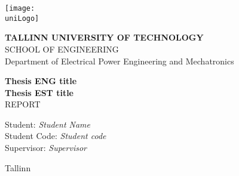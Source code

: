 \begin{titlepage}

    
    \newcommand{\thesisTitle}{
        Thesis ENG title
    }
    
    \newcommand{\thesisTitleEST}{Thesis EST title}
    
    \begin{flushleft}
        \texttt{[image: \\uniLogo]}
    
    
        \textcolor{TTUgray}{
            \textbf{TALLINN UNIVERSITY OF TECHNOLOGY} \\
            SCHOOL OF ENGINEERING \\
            Department of Electrical Power Engineering and Mechatronics}
    \end{flushleft}
    
    
        \begin{center}
            
    
            \vspace*{4cm}
            
            {
                { \textbf{\thesisTitle}} \\
                \vspace*{0.5cm}
                { \textbf{\thesisTitleEST}} \\
                \vspace*{0.7cm}
                { REPORT}
            }
    
            \vspace{1.5cm}
    
            \begin{flushright}
                Student: {\it Student Name} \\
                Student Code: {\it Student code} \\
                Supervisor: {\it Supervisor}
            \end{flushright}
    
            \vspace*{5cm}
    
            Tallinn \the\year{}
    
        \end{center}
    \end{titlepage}